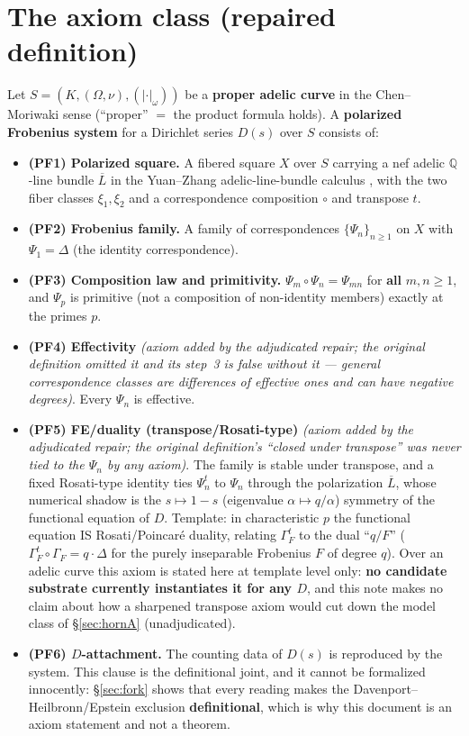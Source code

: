 \documentclass[11pt]{article}
\theoremstyle{plain}
\theoremstyle{definition}
\theoremstyle{remark}
\newcommand{\Lb}{\overline{L}}
\begin{document}
\section{The axiom class (repaired definition)}\label{sec:axioms}

Let $S = (K, (\Omega, \nu), (|\cdot|_\omega))$ be a \textbf{proper adelic curve}
in the Chen--Moriwaki sense \cite{CM} (``proper'' $=$ the product formula holds).
A \textbf{polarized Frobenius system} for a Dirichlet series $D(s)$ over $S$
consists of:

\begin{itemize}
\item \textbf{(PF1) Polarized square.} A fibered square $X$ over $S$ carrying a
nef adelic $\mathbb{Q}$-line bundle $\Lb$ in the Yuan--Zhang adelic-line-bundle
calculus \cite{YZ}, with the two fiber classes $\xi_1, \xi_2$ and a
correspondence composition $\circ$ and transpose $t$.
\item \textbf{(PF2) Frobenius family.} A family of correspondences
$\{\Psi_n\}_{n \ge 1}$ on $X$ with $\Psi_1 = \Delta$ (the identity
correspondence).
\item \textbf{(PF3) Composition law and primitivity.}
$\Psi_m \circ \Psi_n = \Psi_{mn}$ for \textbf{all} $m, n \ge 1$, and $\Psi_p$ is
primitive (not a composition of non-identity members) exactly at the primes $p$.
\item \textbf{(PF4) Effectivity} \emph{(axiom added by the adjudicated repair;
the original definition omitted it and its step~3 is false without it --- general
correspondence classes are differences of effective ones and can have negative
degrees)}. Every $\Psi_n$ is effective.
\item \textbf{(PF5) FE/duality (transpose/Rosati-type)} \emph{(axiom added by the
adjudicated repair; the original definition's ``closed under transpose'' was
never tied to the $\Psi_n$ by any axiom)}. The family is stable under transpose,
and a fixed Rosati-type identity ties $\Psi_n^t$ to $\Psi_n$ through the
polarization $\Lb$, whose numerical shadow is the $s \mapsto 1-s$ (eigenvalue
$\alpha \mapsto q/\alpha$) symmetry of the functional equation of $D$. Template:
in characteristic $p$ the functional equation IS Rosati/Poincar\'e duality,
relating $\Gamma_F^t$ to the dual ``$q/F$''
($\Gamma_F^t \circ \Gamma_F = q \cdot \Delta$ for the purely inseparable
Frobenius $F$ of degree $q$). Over an adelic curve this axiom is stated here at
template level only: \textbf{no candidate substrate currently instantiates it for
any $D$}, and this note makes no claim about how a sharpened transpose axiom
would cut down the model class of \S\ref{sec:hornA} (unadjudicated).
\item \textbf{(PF6) $D$-attachment.} The counting data of $D(s)$ is reproduced by
the system. This clause is the definitional joint, and it cannot be formalized
innocently: \S\ref{sec:fork} shows that every reading makes the
Davenport--Heilbronn/Epstein exclusion \textbf{definitional}, which is why this
document is an axiom statement and not a theorem.
\end{itemize}
\end{document}
